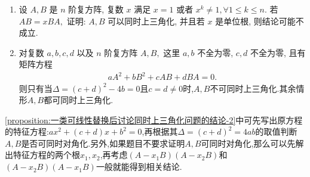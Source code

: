 \documentclass[../../main.tex]{subfiles}%
\begin{document}
\begin{proposition}\label{proposition:一类可线性替换后讨论同时上三角化问题的结论}
\begin{enumerate}[(1)]
\item\label{proposition:一类可线性替换后讨论同时上三角化问题的结论-1} 设 \(A, B\) 是 \(n\) 阶复方阵, 复数 \(x\) 满足 \(x=1\) 或者 \(x^k \ne 1, \forall 1 \leqslant k \leqslant n.\) 若 \(AB=xBA,\) 证明: \(A, B\) 可以同时上三角化, 并且若 \(x\) 是单位根, 则结论可能不成立.

\item\label{proposition:一类可线性替换后讨论同时上三角化问题的结论-2} 对复数 \(a, b, c, d\) 以及 \(n\) 阶复方阵 \(A, B,\) 这里 \(a, b\) 不全为零, \(c, d\) 不全为零, 且有矩阵方程
\begin{align*}
aA^2+bB^2+cAB+dBA=0.
\end{align*}
则只有当$\Delta =\left( c+d \right) ^2-4b=0$且$c=d\neq 0$时,$A,B$不可同时上三角化.其余情形$A,B$都可同时上三角化.
\end{enumerate}
\end{proposition}
\begin{remark}
\ref{proposition:一类可线性替换后讨论同时上三角化问题的结论-2}中可先写出原方程的特征方程:$ax^2+(c+d)x+b^2=0$,再根据其$\Delta = (c+d)^2=4ab$的取值判断$A,B$是否可同时对角化.另外,如果题目不要求证明$A,B$可同时对角化,那么可以先解出特征方程的两个根$x_1,x_2$,再考虑$(A-x_1B)(A-x_2B)$和$(A-x_2B)(A-x_1B)$一般就能得到相关结论.
\end{remark}
\end{document}
